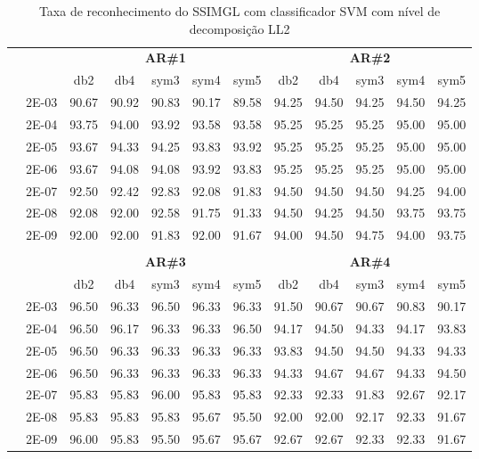 \begin{table}[H]
	\centering
    \normalsize
	\caption{Taxa de reconhecimento do SSIMGL com classificador SVM com nível de decomposição LL2}
	\begin{tabular}{|c|c|c c c c c|c c c c c|}
\cline{3-12}
\multicolumn{2}{c|}{\multirow{2}{*}{}} & \multicolumn{5}{c|}{\textbf{AR\#1}}  & \multicolumn{5}{c|}{\textbf{AR\#2}} \\\cline{3-12}

\multicolumn{2}{c|}{}  & db2 & db4 & sym3 & sym4 & sym5 & db2 & db4& sym3 & sym4 & sym5 \\\hline
\multicolumn{1}{|c|}{ \multirow{6}{*}{\rotatebox[origin=c]{90}{\textbf{Gamma}}} }
&2E-03&	90.67&	90.92&	90.83	&90.17&	89.58&	94.25&	94.50&	94.25	&94.50&	94.25	\\\cline{2-12}
&2E-04&	93.75&	94.00&	93.92	&93.58&	93.58&	95.25&	95.25&	95.25	&95.00&	95.00	\\\cline{2-12}
&2E-05&	93.67&	94.33&	94.25	&93.83&	93.92&	95.25&	95.25&	95.25	&95.00&	95.00	\\\cline{2-12}
&2E-06&	93.67&	94.08&	94.08	&93.92&	93.83&	95.25&	95.25&	95.25	&95.00&	95.00	\\\cline{2-12}
&2E-07&	92.50&	92.42&	92.83	&92.08&	91.83&	94.50&	94.50&	94.50	&94.25&	94.00	\\\cline{2-12}
&2E-08&	92.08&	92.00&	92.58	&91.75&	91.33&	94.50&	94.25&	94.50	&93.75&	93.75	\\\cline{2-12}
&2E-09&	92.00&	92.00&	91.83	&92.00&	91.67&	94.00&	94.50&	94.75	&94.00&	93.75	




	
\\ \midrule
\multicolumn{12}{c}{}\\ 

\cline{3-12}
\multicolumn{2}{c}{} & \multicolumn{5}{|c|}{\textbf{AR\#3}}  & \multicolumn{5}{c|}{\textbf{AR\#4}} \\\cline{3-12}
\multicolumn{2}{c}{}  & \multicolumn{1}{|c}{db2} & db4 & sym3 & sym4 & sym5 & db2 & db4& sym3 & sym4 & sym5 \\\hline
\multicolumn{1}{|c|}{ \multirow{6}{*}{\rotatebox[origin=c]{90}{\textbf{Gamma}}} }
&2E-03&	96.50&	96.33&	96.50	&96.33&	96.33&	91.50&	90.67&	90.67	&90.83&	90.17	\\\cline{2-12}
&2E-04&	96.50&	96.17&	96.33	&96.33&	96.50&	94.17&	94.50&	94.33	&94.17&	93.83	\\\cline{2-12}
&2E-05&	96.50&	96.33&	96.33	&96.33&	96.33&	93.83&	94.50&	94.50	&94.33&	94.33	\\\cline{2-12}
&2E-06&	96.50&	96.33&	96.33	&96.33&	96.33&	94.33&	94.67&	94.67	&94.33&	94.50	\\\cline{2-12}
&2E-07&	95.83&	95.83&	96.00	&95.83&	95.83&	92.33&	92.33&	91.83	&92.67&	92.17	\\\cline{2-12}
&2E-08&	95.83&	95.83&	95.83	&95.67&	95.50&	92.00&	92.00&	92.17	&92.33&	91.67	\\\cline{2-12}
&2E-09&	96.00&	95.83&	95.50	&95.67&	95.67&	92.67&	92.67&	92.33	&92.33&	91.67	


\end{tabular}
\end{table}
